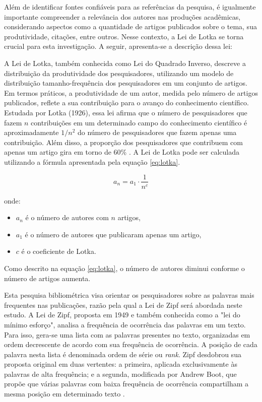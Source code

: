 \documentclass[openany,oneside,a4paper,9pt]{extarticle}
\begin{document}
Além de identificar fontes confiáveis para as referências da pesquisa, é igualmente importante compreender a relevância dos autores nas produções acadêmicas, considerando aspectos como a quantidade de artigos publicados sobre o tema, sua produtividade, citações, entre outros. Nesse contexto, a Lei de Lotka se torna crucial para esta investigação. A seguir, apresenta-se a descrição dessa lei:

A Lei de Lotka, também conhecida como Lei do Quadrado Inverso, descreve a distribuição da produtividade dos pesquisadores, utilizando um modelo de distribuição tamanho-frequência dos pesquisadores em um conjunto de artigos. Em termos práticos, a produtividade de um autor, medida pelo número de artigos publicados, reflete a sua contribuição para o avanço do conhecimento científico. Estudada por Lotka (1926), essa lei afirma que o número de pesquisadores que fazem $n$ contribuições em um determinado campo do conhecimento científico é aproximadamente $1/n^2
$ do número de pesquisadores que fazem apenas uma contribuição. Além disso, a proporção dos pesquisadores que contribuem com apenas um artigo gira em torno de 60\% \cite{melo2017bibliometria}. A Lei de Lotka pode ser calculada utilizando a fórmula apresentada pela equação \ref{eq:lotka}.

\begin{equation}
a_n = a_1 \cdot \frac{1}{n^c}
\label{eq:lotka}
\end{equation}

onde:
\begin{itemize}
    \item \( a_n \) é o número de autores com \( n \) artigos,
    \item \( a_1 \) é o número de autores que publicaram apenas um artigo,
    \item \( c \) é o coeficiente de Lotka.
\end{itemize}

Como descrito na equação \ref{eq:lotka}, o número de autores diminui conforme o número de artigos aumenta.

Esta pesquisa bibliométrica visa orientar os pesquisadores sobre as palavras mais frequentes nas publicações, razão pela qual a Lei de Zipf será abordada neste estudo. A Lei de Zipf, proposta em 1949 e também conhecida como a "lei do mínimo esforço", analisa a frequência de ocorrência das palavras em um texto. Para isso, gera-se uma lista com as palavras presentes no texto, organizadas em ordem decrescente de acordo com sua frequência de ocorrência. A posição de cada palavra nesta lista é denominada ordem de série ou \textit{rank}. Zipf desdobrou sua proposta original em duas vertentes: a primeira, aplicada exclusivamente às palavras de alta frequência; e a segunda, modificada por Andrew Boot, que propõe que várias palavras com baixa frequência de ocorrência compartilham a mesma posição em determinado texto \cite{gracio2020topicos}.
\end{document}
